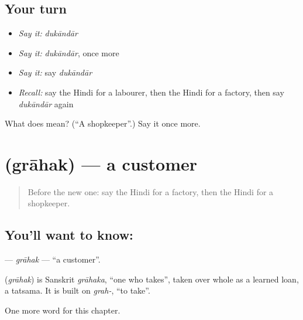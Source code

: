 \subsection*{Your turn}
\begin{itemize}
\raggedright
  \item \emph{Say it:} \emph{dukāndār}
  \item \emph{Say it:} \emph{dukāndār}, once more
  \item \emph{Say it:} say \emph{dukāndār}
  \item \emph{Recall:} say the Hindi for a labourer, then the Hindi for a factory, then say \emph{dukāndār} again
\end{itemize}

\begin{tcolorbox}[breakable,colback=teal!4,colframe=teal!35!black,title={Before you move on}]
What does  mean? (\textquotedblleft{}A shopkeeper\textquotedblright{}.) Say it once more.
\end{tcolorbox}
\section[\texorpdfstring{\hi{ग्राहक} (grāhak)}{ग्राहक (grāhak)}]{ (grāhak) — a customer}

\label{lesson:HI-C183-grahak}



\begin{quote}
Before the new one: say the Hindi for a factory, then the Hindi for a shopkeeper.
\end{quote}

\subsection*{You'll want to know: }
\textbf{} — \emph{grāhak} — \textquotedblleft{}a customer\textquotedblright{}.

\begin{cousinweb}
\textbf{} (\emph{grāhak}) is Sanskrit \emph{grāhaka}, \textquotedblleft{}one who takes\textquotedblright{}, taken over whole as a learned loan, a tatsama. It is built on \emph{grah-}, \textquotedblleft{}to take\textquotedblright{}.
\end{cousinweb}

\begin{grammarlens}[title={What you've built}]
One more word for this chapter.
\end{grammarlens}

